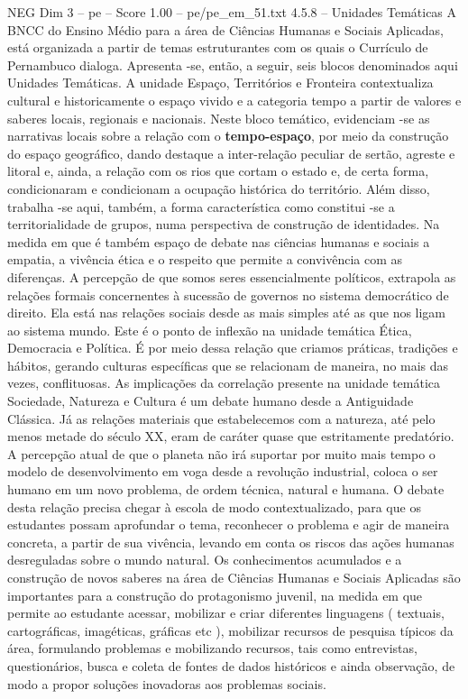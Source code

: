 \begin{textsample}{NEG Dim 3 – pe – Score 1.00 – pe/pe\_em\_51.txt}  \label{ex:f3_neg_013}
4.5.8 – Unidades Temáticas A BNCC do Ensino Médio para a área de Ciências Humanas e Sociais Aplicadas, está organizada a partir de temas estruturantes com os quais o Currículo de Pernambuco dialoga.
Apresenta -se, então, a seguir, seis blocos denominados aqui Unidades Temáticas.
A unidade Espaço, Territórios e Fronteira contextualiza cultural e historicamente o espaço vivido e a categoria tempo a partir de valores e saberes locais, regionais e nacionais.
Neste bloco temático, evidenciam -se as narrativas locais sobre a relação com o \textbf{tempo-espaço}, por meio da construção do espaço geográfico, dando destaque a inter-relação peculiar de sertão, agreste e litoral e, ainda, a relação com os rios que cortam o estado e, de certa forma, condicionaram e condicionam a ocupação histórica do território.
Além disso, trabalha -se aqui, também, a forma característica como constitui -se a territorialidade de grupos, numa perspectiva de construção de identidades.
Na medida em que é também espaço de debate nas ciências humanas e sociais a empatia, a vivência ética e o respeito que permite a convivência com as diferenças.
A percepção de que somos seres essencialmente políticos, extrapola as relações formais concernentes à sucessão de governos no sistema democrático de direito.
Ela está nas relações sociais desde as mais simples até as que nos ligam ao sistema mundo.
Este é o ponto de inflexão na unidade temática Ética, Democracia e Política.
É por meio dessa relação que criamos práticas, tradições e hábitos, gerando culturas específicas que se relacionam de maneira, no mais das vezes, conflituosas.
As implicações da correlação presente na unidade temática Sociedade, Natureza e Cultura é um debate humano desde a Antiguidade Clássica.
Já as relações materiais que estabelecemos com a natureza, até pelo menos metade do século XX, eram de caráter quase que estritamente predatório.
A percepção atual de que o planeta não irá suportar por muito mais tempo o modelo de desenvolvimento em voga desde a revolução industrial, coloca o ser humano em um novo problema, de ordem técnica, natural e humana.
O debate desta relação precisa chegar à escola de modo contextualizado, para que os estudantes possam aprofundar o tema, reconhecer o problema e agir de maneira concreta, a partir de sua vivência, levando em conta os riscos das ações humanas desreguladas sobre o mundo natural.
Os conhecimentos acumulados e a construção de novos saberes na área de Ciências Humanas e Sociais Aplicadas são importantes para a construção do protagonismo juvenil, na medida em que permite ao estudante acessar, mobilizar e criar diferentes linguagens ( textuais, cartográficas, imagéticas, gráficas etc ), mobilizar recursos de pesquisa típicos da área, formulando problemas e mobilizando recursos, tais como entrevistas, questionários, busca e coleta de fontes de dados históricos e ainda observação, de modo a propor soluções inovadoras aos problemas sociais.

\end{textsample}

